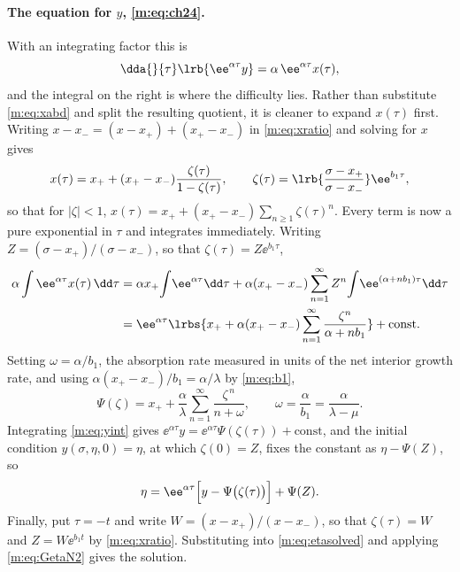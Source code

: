 \paragraph{The equation for $y$, \eqref{m:eq:ch24}.}
With an integrating factor this is
\begin{equation}
\label{m:eq:yint}
\dda{}{\tau}\lrb{\ee^{\alpha\tau}y} = \alpha\,\ee^{\alpha\tau}x(\tau),
\end{equation}
and the integral on the right is where the difficulty lies. Rather than substitute
\cref{m:eq:xabd} and split the resulting quotient, it is cleaner to expand
$x(\tau)$ first. Writing $x-x_- = (x-x_+)+(x_+-x_-)$ in \cref{m:eq:xratio} and
solving for $x$ gives
\begin{equation}
\label{m:eq:xgeom}
x(\tau) = x_+ + (x_+-x_-)\frac{\zeta(\tau)}{1-\zeta(\tau)},
\qquad
\zeta(\tau) = \lrb{\frac{\sigma-x_+}{\sigma-x_-}}\ee^{b_1\tau},
\end{equation}
so that for $|\zeta|<1$,
$x(\tau) = x_+ + (x_+-x_-)\sum_{n\ge1}\zeta(\tau)^n$. Every term is now a pure
exponential in $\tau$ and integrates immediately. Writing
$Z = (\sigma-x_+)/(\sigma-x_-)$, so that $\zeta(\tau)=Z\ee^{b_1\tau}$,
\begin{align*}
\alpha\int\ee^{\alpha\tau}x(\tau)\,\dd\tau
&= \alpha x_+\!\int\!\ee^{\alpha\tau}\dd\tau
 + \alpha(x_+-x_-)\sum_{n=1}^{\infty}Z^n\!\int\!\ee^{(\alpha+nb_1)\tau}\dd\tau\\
&= \ee^{\alpha\tau}\lrbs{x_+ + \alpha(x_+-x_-)\sum_{n=1}^{\infty}\frac{\zeta^n}{\alpha+nb_1}}
 + \text{const} .
\end{align*}
Setting $\omega = \alpha/b_1$, the absorption rate measured in units of the net
interior growth rate, and using $\alpha(x_+-x_-)/b_1 = \alpha/\lambda$ by
\cref{m:eq:b1},
\begin{equation}
\label{m:eq:Psidef}
\Psi(\zeta) = x_+ + \frac{\alpha}{\lambda}\sum_{n=1}^{\infty}\frac{\zeta^{\,n}}{n+\omega},
\qquad
\omega = \frac{\alpha}{b_1} = \frac{\alpha}{\lambda-\mu} .
\end{equation}
Integrating \cref{m:eq:yint} gives
$\ee^{\alpha\tau}y = \ee^{\alpha\tau}\Psi(\zeta(\tau))+\text{const}$, and the
initial condition $y(\sigma,\eta,0)=\eta$, at which $\zeta(0)=Z$, fixes the constant
as $\eta-\Psi(Z)$, so
\begin{equation}
\label{m:eq:etasolved}
\eta = \ee^{\alpha\tau}\Bigl[y-\Psi\bigl(\zeta(\tau)\bigr)\Bigr] + \Psi(Z) .
\end{equation}
Finally, put $\tau=-t$ and write $W = (x-x_+)/(x-x_-)$, so that $\zeta(\tau)=W$ and
$Z = W\ee^{b_1t}$ by \cref{m:eq:xratio}. Substituting into \cref{m:eq:etasolved} and
applying \cref{m:eq:GetaN2} gives the solution.

